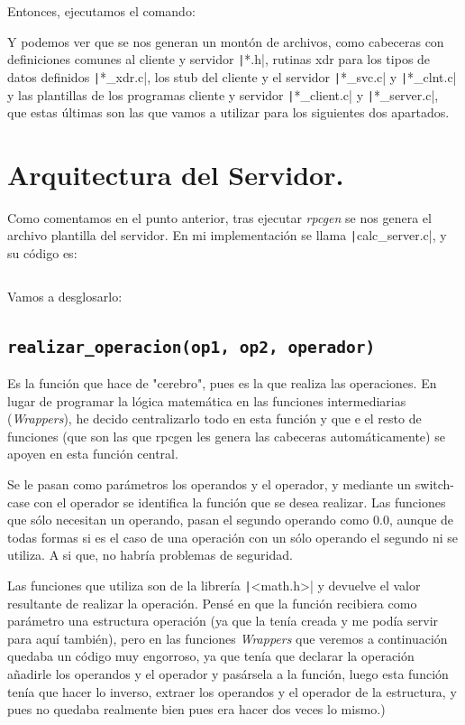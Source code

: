 \documentclass[a4paper,12pt]{article}
\begin{document}
		Entonces, ejecutamos el comando:
		
		\begin{center}
		\end{center}
		
		Y podemos ver que se nos generan un montón de archivos, como cabeceras con
		definiciones comunes al cliente y servidor \texttt|*.h|, rutinas xdr
		para los tipos de datos definidos \texttt|*_xdr.c|, los stub del cliente
		y el servidor \texttt|*_svc.c| y \texttt|*_clnt.c| y las
		plantillas de los programas cliente y servidor \texttt|*_client.c| y
		\texttt|*_server.c|, que estas últimas son las que vamos a utilizar para
		los siguientes dos apartados.

\section{Arquitectura del Servidor.}

	Como comentamos en el punto anterior, tras ejecutar \textit{rpcgen} se nos
	genera el archivo plantilla del servidor. En mi implementación se llama
	\texttt|calc_server.c|, y su código es:
	
	\inputminted[linenos, frame=lines, fontsize=\footnotesize]{C}{../codigo/calc_server.c}
	
	Vamos a desglosarlo:
	
	\subsection{\texttt{realizar\_operacion(op1, op2, operador)}}	
		Es la función que hace de "cerebro", pues es la que realiza las operaciones. En lugar de programar la lógica matemática en las funciones intermediarias (\textit{Wrappers}), he decido centralizarlo todo en esta función y que e el resto de funciones (que son las que rpcgen les genera las cabeceras automáticamente) se apoyen en esta función central.
		
		Se le pasan como parámetros los operandos y el operador, y mediante un
		switch-case con el operador se identifica la función que se desea realizar. Las
		funciones que sólo necesitan un operando, pasan el segundo operando como 0.0,
		aunque de todas formas si es el caso de una operación con un sólo operando el
		segundo ni se utiliza. A si que, no habría problemas de seguridad.
		
		Las funciones que utiliza son de la librería \texttt|<math.h>| y
		devuelve el valor resultante de realizar la operación. Pensé en que la función
		recibiera como parámetro una estructura operación (ya que la tenía creada y me
		podía servir para aquí también), pero en las funciones \textit{Wrappers} que
		veremos a continuación quedaba un código muy engorroso, ya que tenía que
		declarar la operación añadirle los operandos y el operador y pasársela a la
		función, luego esta función tenía que hacer lo inverso, extraer los operandos y
		el operador de la estructura, y pues no quedaba realmente bien pues era hacer
		dos veces lo mismo.)
	
\end{document}
